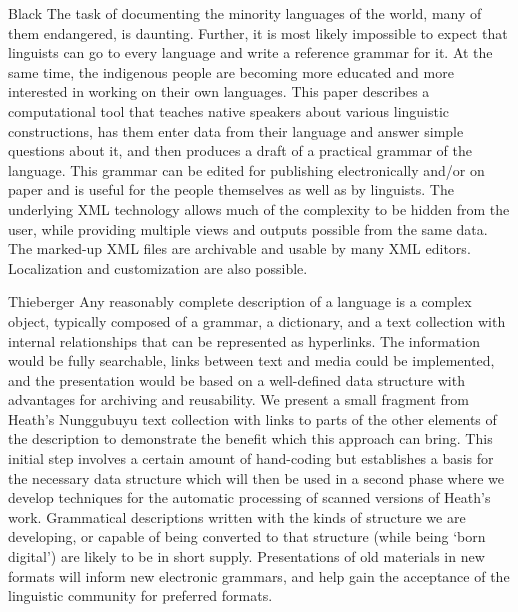 Black
The task of documenting the minority languages of the world, many of them endangered, is daunting. Further, it is most likely impossible to expect that linguists can go to every language and write a reference grammar for it. At the same time, the indigenous people are becoming more educated and more interested in working on their own languages. This paper describes a computational tool that teaches native speakers about various linguistic constructions, has them enter data from their language and answer simple questions about it, and then produces a draft of a practical grammar of the language. This grammar can be edited for publishing electronically and/or on paper and is useful for the people themselves as well as by linguists.
The underlying XML technology  allows much of the complexity to be hidden from the user, while providing multiple views and outputs possible from the same data. The marked-up XML files are archivable and usable by many XML editors. Localization and customization are also possible. 

Thieberger
Any reasonably complete description of a language is a complex object, typically composed of a grammar, a dictionary, and a text collection with internal relationships that can be represented as hyperlinks. The information would be fully searchable, links between text and media could be implemented, and the presentation would be based on a well-defined data structure with advantages for archiving and reusability. 
We present a small fragment from Heath's Nunggubuyu text collection with links to parts of the other elements of the description to demonstrate the benefit which this approach can bring. This initial step involves a certain amount of hand-coding but establishes a basis for the necessary data structure which will then be used in a second phase where we develop techniques for the automatic processing of scanned versions of Heath's work. 
Grammatical descriptions written with the kinds of structure we are developing, or capable of being converted to that structure (while being `born digital') are likely to be in short supply. Presentations of old materials in new formats will inform new electronic grammars, and help gain the acceptance of the linguistic community for preferred formats.

